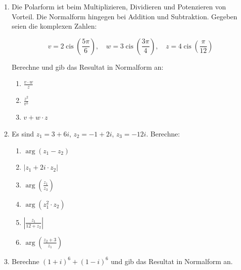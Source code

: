\begin{ueb}
\begin{enumerate}
    

\clearpage

        \item Die Polarform ist beim Multiplizieren, Dividieren und Potenzieren von Vorteil. Die Normalform hingegen bei Addition und Subtraktion.  
        Gegeben seien die komplexen Zahlen:
        
        \[
        v = 2 \operatorname{cis} \left(\frac{5\pi}{6}\right), \quad w = 3 \operatorname{cis} \left(\frac{3\pi}{4}\right), \quad z = 4 \operatorname{cis} \left(\frac{\pi}{12}\right)
        \]
        
        Berechne und gib das Resultat in Normalform an:
        
        \begin{enumerate}
            \item \( \frac{v \cdot w}{z} \)
            \item \( \frac{z^2}{v^5} \)
            \item \( v + w \cdot z \)
        \end{enumerate}
        
    
        \item Es sind $z_1 = 3 + 6i$, $z_2 = -1 + 2i$, $z_3 = -12i$. Berechne:
        \begin{enumerate}
            \item $\arg(z_1 - z_2)$
            \item $|z_1 + 2i \cdot z_2|$
            \item $\arg \left( \frac{z_1}{z_3} \right)$
            \item $\arg(z_1^2 \cdot z_2)$
            \item $\left|\frac{z_1}{12 + z_2}\right|$
            \item $\arg \left( \frac{z_2 + 3}{z_1} \right)$
        \end{enumerate}

        \item Berechne $(1+i)^6 + (1-i)^6$ und gib das Resultat in Normalform an.
    

\end{enumerate}
\end{ueb}
